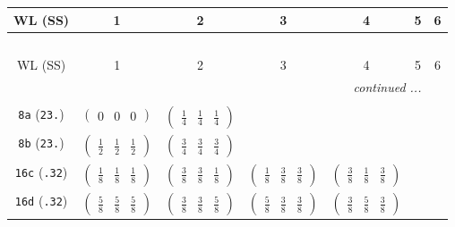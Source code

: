 \documentclass[fleqn,9pt,landscape]{jsarticle}
\begin{document}
\begin{center}
\renewcommand{\arraystretch}{1.2}
\begin{longtable}{ccccccc}
 \hline \hline
WL (SS) & 1 & 2 & 3 & 4 & 5 & 6 \\ \hline \endfirsthead

\multicolumn{6}{l}{\tablename\ \thetable{}} \\
 \hline \hline
WL (SS) & 1 & 2 & 3 & 4 & 5 & 6 \\ \hline \endhead

 \hline \hline
\multicolumn{6}{r}{\footnotesize\it continued ...} \\ \endfoot

 \hline \hline
\multicolumn{6}{r}{} \\ \endlastfoot

{\tt 8a} ({\tt 23.}) & $ \begin{pmatrix} 0 & 0 & 0 \end{pmatrix} $ & $ \begin{pmatrix} \frac{1}{4} & \frac{1}{4} & \frac{1}{4} \end{pmatrix} $ & $  $ & $  $ & $  $ & $  $ \\ \hline
{\tt 8b} ({\tt 23.}) & $ \begin{pmatrix} \frac{1}{2} & \frac{1}{2} & \frac{1}{2} \end{pmatrix} $ & $ \begin{pmatrix} \frac{3}{4} & \frac{3}{4} & \frac{3}{4} \end{pmatrix} $ & $  $ & $  $ & $  $ & $  $ \\ \hline
{\tt 16c} ({\tt .32}) & $ \begin{pmatrix} \frac{1}{8} & \frac{1}{8} & \frac{1}{8} \end{pmatrix} $ & $ \begin{pmatrix} \frac{3}{8} & \frac{3}{8} & \frac{1}{8} \end{pmatrix} $ & $ \begin{pmatrix} \frac{1}{8} & \frac{3}{8} & \frac{3}{8} \end{pmatrix} $ & $ \begin{pmatrix} \frac{3}{8} & \frac{1}{8} & \frac{3}{8} \end{pmatrix} $ & $  $ & $  $ \\ \hline
{\tt 16d} ({\tt .32}) & $ \begin{pmatrix} \frac{5}{8} & \frac{5}{8} & \frac{5}{8} \end{pmatrix} $ & $ \begin{pmatrix} \frac{3}{8} & \frac{3}{8} & \frac{5}{8} \end{pmatrix} $ & $ \begin{pmatrix} \frac{5}{8} & \frac{3}{8} & \frac{3}{8} \end{pmatrix} $ & $ \begin{pmatrix} \frac{3}{8} & \frac{5}{8} & \frac{3}{8} \end{pmatrix} $ & $  $ & $  $ \\ \hline

\end{longtable}
\end{center}
\end{document}

